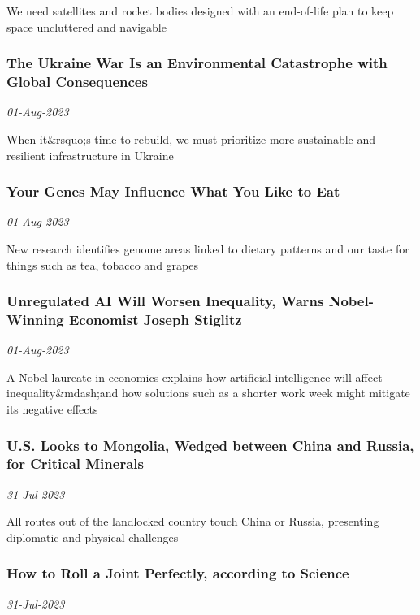 We need satellites and rocket bodies designed with an end-of-life plan to keep space uncluttered and navigable
\subsubsection{The Ukraine War Is an Environmental Catastrophe with Global Consequences \href{https://www.scientificamerican.com/article/the-ukraine-war-is-an-environmental-catastrophe-with-global-consequences/}{}}
\textit{01-Aug-2023}

When it\&rsquo;s time to rebuild, we must prioritize more sustainable and resilient infrastructure in Ukraine
\subsubsection{Your Genes May Influence What You Like to Eat \href{https://www.scientificamerican.com/article/your-genes-may-influence-what-you-like-to-eat/}{}}
\textit{01-Aug-2023}

New research identifies genome areas linked to dietary patterns and our taste for things such as tea, tobacco and grapes
\subsubsection{Unregulated AI Will Worsen Inequality, Warns Nobel-Winning Economist Joseph Stiglitz \href{https://www.scientificamerican.com/article/unregulated-ai-will-worsen-inequality-warns-nobel-winning-economist-joseph-stiglitz/}{}}
\textit{01-Aug-2023}

A Nobel laureate in economics explains how artificial intelligence will affect inequality\&mdash;and how solutions such as a shorter work week might mitigate its negative effects
\subsubsection{U.S. Looks to Mongolia, Wedged between China and Russia, for Critical Minerals \href{https://www.scientificamerican.com/article/u-s-looks-to-mongolia-wedged-between-china-and-russia-for-critical-minerals/}{}}
\textit{31-Jul-2023}

All routes out of the landlocked country touch China or Russia, presenting diplomatic and physical challenges
\subsubsection{How to Roll a Joint Perfectly, according to Science \href{https://www.scientificamerican.com/podcast/episode/how-to-roll-a-joint-perfectly-according-to-science/}{}}
\textit{31-Jul-2023}

